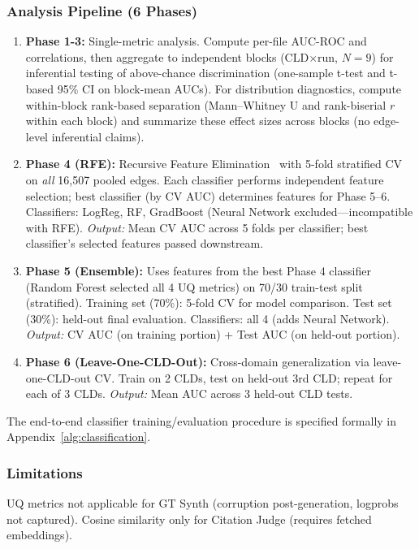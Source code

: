 \subsubsection{Analysis Pipeline (6 Phases)}
\begin{enumerate}[noitemsep]
    \item \textbf{Phase 1-3:} Single-metric analysis. Compute per-file AUC-ROC and correlations, then aggregate to independent blocks (CLD$\times$run, $N=9$) for inferential testing of above-chance discrimination (one-sample t-test and t-based 95\% CI on block-mean AUCs). For distribution diagnostics, compute within-block rank-based separation (Mann--Whitney U and rank-biserial $r$ within each block) and summarize these effect sizes across blocks (no edge-level inferential claims).
    \item \textbf{Phase 4 (RFE):} Recursive Feature Elimination~\cite{pedregosa2011sklearn} with 5-fold stratified CV on \textit{all} 16,507 pooled edges. Each classifier performs independent feature selection; best classifier (by CV AUC) determines features for Phase 5--6. Classifiers: LogReg, RF, GradBoost (Neural Network excluded---incompatible with RFE). \textit{Output:} Mean CV AUC across 5 folds per classifier; best classifier's selected features passed downstream.
    \item \textbf{Phase 5 (Ensemble):} Uses features from the best Phase 4 classifier (Random Forest selected all 4 UQ metrics) on 70/30 train-test split (stratified). Training set (70\%): 5-fold CV for model comparison. Test set (30\%): held-out final evaluation. Classifiers: all 4 (adds Neural Network). \textit{Output:} CV AUC (on training portion) + Test AUC (on held-out portion).
    \item \textbf{Phase 6 (Leave-One-CLD-Out):} Cross-domain generalization via leave-one-CLD-out CV. Train on 2 CLDs, test on held-out 3rd CLD; repeat for each of 3 CLDs. \textit{Output:} Mean AUC across 3 held-out CLD tests.
\end{enumerate}
The end-to-end classifier training/evaluation procedure is specified formally in Appendix~\ref{alg:classification}.

\subsubsection{Limitations}
UQ metrics not applicable for GT Synth (corruption post-generation, logprobs not captured). Cosine similarity only for Citation Judge (requires fetched embeddings).

